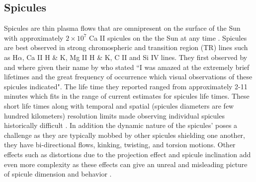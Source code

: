 \documentclass[12pt]{ociamthesis}
\newcommand{\np}{\\ \\}
\begin{document}
\subsection{Spicules}
\label{subsec:Spicules}
Spicules are thin plasma flows that are omnipresent on the surface of the Sun with approximately $2 \times 10^{7}$ Ca II spicules on the the Sun at any time \citep{Judge_2010ApJ}. Spicules are best observed in strong chromospheric and transition region (TR) lines such as H$\alpha$, Ca II H \& K, Mg II H \& K, C II and Si IV lines. They first observed by \cite{Secchi1877} and where given their name by \cite{Roberts1945ApJ} who stated ``I was amazed at the extremely brief lifetimes and the great frequency of occurrence which visual observations of these spicules indicated". The life time they reported ranged from approximately 2-11 minutes which fits in the range of current estimates for spicules life times. These short life times along with temporal and spatial (spicules diameters are few hundred kilometers) resolution limits made observing individual spicules historically difficult \citep{Sterling_2000SoPh}. In addition the dynamic nature of the spicules' poses a challenge as they are typically mobbed by other spicules shielding one another, they have bi-directional flows, kinking, twisting, and torsion motions. Other effects such as distortions due to the projection effect and spicule inclination add even more complexity as these effects can give an unreal and misleading picture of spicule dimension and behavior \citep{Porfir2016A}. \np
%
\end{document}
